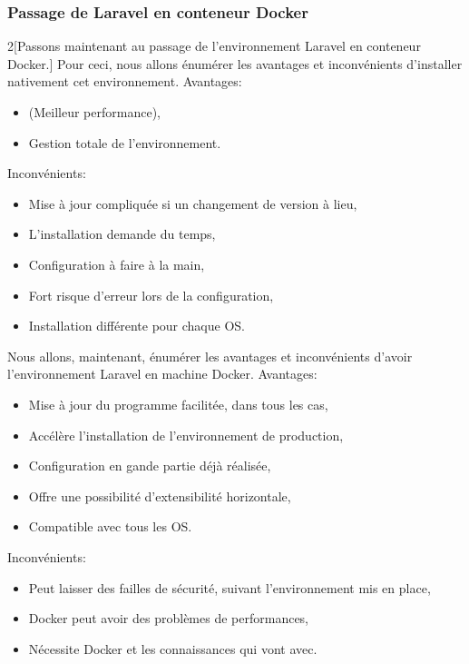 \documentclass[
    iai, %
    il, %
]{heig-tb}
\begin{document}

\subsubsection{Passage de Laravel en conteneur Docker}
\begin{multicols}{2}[Passons maintenant au passage de l'environnement Laravel en conteneur Docker.]
    Pour ceci, nous allons énumérer les avantages et inconvénients d'installer nativement cet environnement.
    Avantages:
    \begin{itemize}
        \item (Meilleur performance),
        \item Gestion totale de l'environnement.
    \end{itemize}

    Inconvénients:
    \begin{itemize}
        \item Mise à jour compliquée si un changement de version à lieu,
        \item L'installation demande du temps,
        \item Configuration à faire à la main,
        \item Fort risque d'erreur lors de la configuration,
        \item Installation différente pour chaque OS.
    \end{itemize}

    \columnbreak
    Nous allons, maintenant, énumérer les avantages et inconvénients d'avoir l'environnement Laravel en machine Docker.
    Avantages:
    \begin{itemize}
        \item Mise à jour du programme facilitée, dans tous les cas,
        \item Accélère l'installation de l'environnement de production,
        \item Configuration en gande partie déjà réalisée,
        \item Offre une possibilité d'extensibilité horizontale,
        \item Compatible avec tous les OS.
    \end{itemize}

    Inconvénients:
    \begin{itemize}
        \item Peut laisser des failles de sécurité, suivant l'environnement mis en place,
        \item Docker peut avoir des problèmes de performances, \cite{labrecque}
        \item Nécessite Docker et les connaissances qui vont avec. \cite{labrecque}
    \end{itemize}
\end{multicols}
\end{document}
